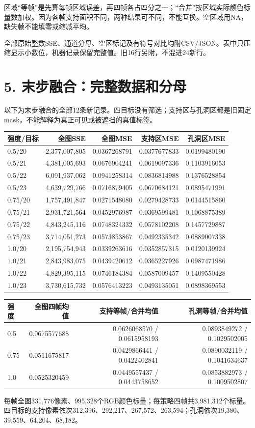 \documentclass[UTF8,10pt,a4paper]{ctexart}
\begin{document}
区域“等帧”是先算每帧区域误差，再四帧各占四分之一；“合并”按区域实际颜色标量数加权。因为各帧支持面积不同，两种结果可不同，不能互换。空区域用NA，缺失帧不能填零或缩减平均。

全部原始整数SSE、通道分母、空区标记及有符号对比均附CSV/JSON。表中只压缩显示小数位，机器记录保留完整值。旧16行另附，不混进24新行。

\clearpage
\section*{5. 末步融合：完整数据和分母}
以下为末步融合的全部12条新记录。四目标没有筛选；支持区与孔洞区都是旧固定mask，不能解释为真正可见或被遮挡的真值标签。
\begin{center}\small\begin{tabular}{lrrrr}\toprule
强度/目标 & 全图SSE & 全图MSE & 支持区MSE & 孔洞区MSE\\\midrule
0.5/20 & 2,377,007,805 & 0.0367268791 & 0.0377677833 & 0.0199480190\\
0.5/21 & 4,381,005,693 & 0.0676904241 & 0.0619097336 & 0.1103916053\\
0.5/22 & 6,091,937,062 & 0.0941258314 & 0.0836814988 & 0.1376528854\\
0.5/23 & 4,639,729,766 & 0.0716879405 & 0.0670684121 & 0.0895471991\\
0.75/20 & 1,757,491,847 & 0.0271548080 & 0.0279428733 & 0.0144515860\\
0.75/21 & 2,931,721,564 & 0.0452976987 & 0.0369599481 & 0.1068875389\\
0.75/22 & 4,843,245,116 & 0.0748324332 & 0.0578102208 & 0.1457729887\\
0.75/23 & 3,714,051,273 & 0.0573853867 & 0.0492335342 & 0.0889007338\\
1.0/20 & 2,195,754,943 & 0.0339263616 & 0.0352857315 & 0.0120139924\\
1.0/21 & 2,843,983,075 & 0.0439420612 & 0.0365227926 & 0.0987471986\\
1.0/22 & 4,829,395,115 & 0.0746184384 & 0.0587009457 & 0.1409550428\\
1.0/23 & 3,730,615,732 & 0.0576413223 & 0.0493135051 & 0.0898369553\\
\bottomrule\end{tabular}\end{center}
\begin{center}\small\begin{tabular}{lrrr}\toprule
强度 & 全图四帧均值 & 支持等帧/合并均值 & 孔洞等帧/合并均值\\\midrule
0.5 & 0.0675577688 & 0.0626068570 / 0.0615958193 & 0.0893849272 / 0.1029502005\\
0.75 & 0.0511675817 & 0.0429866441 / 0.0422402841 & 0.0890032119 / 0.1041634637\\
1.0 & 0.0525320459 & 0.0449557437 / 0.0443758652 & 0.0853882973 / 0.1009502807\\
\bottomrule\end{tabular}\end{center}
每帧全图331,776像素、995,328个RGB颜色标量；每策略四帧共3,981,312个标量。四目标的支持像素依次312,396、292,217、267,572、263,594；孔洞依次19,380、39,559、64,204、68,182。
\end{document}
